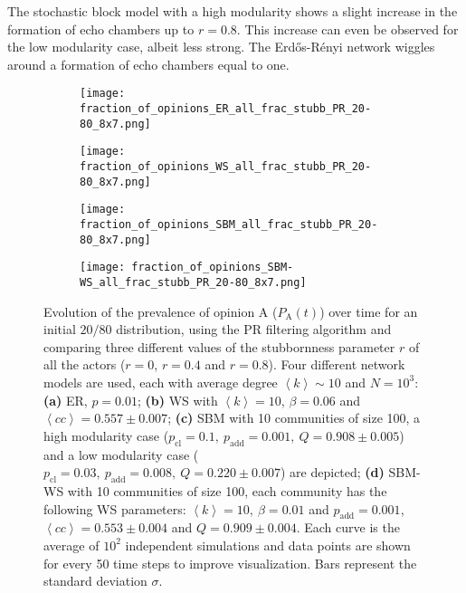 \documentclass[11 pt , letterpaper , twoside , openright]{book}
\begin{document}
\newline
The stochastic block model with a high modularity shows a slight increase in the formation of echo chambers up to $r = 0.8$. This increase can even be observed for the low modularity case, albeit less strong. The Erd\H{o}s-R\'{e}nyi network wiggles around a formation of echo chambers equal to one.
\newpage
\begin{figure}[H]
  \begin{subfigure}[b]{0.49\textwidth}
    \caption{}
  	\texttt{[image: fraction\_of\_opinions\_ER\_all\_frac\_stubb\_PR\_20-80\_8x7.png]}
  \end{subfigure}
  \begin{subfigure}[b]{0.49\textwidth}
    \caption{}
  	\texttt{[image: fraction\_of\_opinions\_WS\_all\_frac\_stubb\_PR\_20-80\_8x7.png]}
  \end{subfigure}
  \begin{subfigure}[b]{0.49\textwidth}
    \caption{}
    \texttt{[image: fraction\_of\_opinions\_SBM\_all\_frac\_stubb\_PR\_20-80\_8x7.png]}
  \end{subfigure}
  \begin{subfigure}[b]{0.49\textwidth}
    \caption{}
    \texttt{[image: fraction\_of\_opinions\_SBM-WS\_all\_frac\_stubb\_PR\_20-80\_8x7.png]}
  \end{subfigure}
  \captionsetup{format=plain}
  \caption[Evolution of the prevalence of opinion A ($P_\text{A}(t)$) over time for an initial $20/80$ opinion distribution, using the PR filtering algorithm and comparing three different values of the stubbornness parameter $r$ of all the actors ($r = 0$, $r = 0.4$ and $r = 0.8$).]{Evolution of the prevalence of opinion A ($P_\text{A}(t)$) over time for an initial $20/80$ distribution, using the PR filtering algorithm and comparing three different values of the stubbornness parameter $r$ of all the actors ($r = 0$, $r = 0.4$ and $r = 0.8$). Four different network models are used, each with average degree $\left<k\right> \sim 10$ and $N = 10^3$: \textbf{(a)} ER, $p=0.01$; \textbf{(b)} WS with $\left<k\right> = 10$, $\beta = 0.06$ and $\left<cc\right> = 0.557 \pm 0.007$; \textbf{(c)} SBM with 10 communities of size 100, a high modularity case ($p_{\text{cl}} = 0.1,\ p_{\text{add}} = 0.001,\ Q = 0.908 \pm 0.005$) and a low modularity case ($p_{\text{cl}} = 0.03,\ p_{\text{add}} = 0.008,\ Q = 0.220 \pm 0.007$) are depicted; \textbf{(d)} SBM-WS with 10 communities of size 100, each community has the following WS parameters: $\left<k\right> = 10,\ \beta = 0.01$ and $p_{\text{add}} = 0.001$, $\left<cc\right> = 0.553 \pm 0.004$ and $Q = 0.909 \pm 0.004$. Each curve is the average of $10^2$ independent simulations and data points are shown for every 50 time steps to improve visualization. Bars represent the standard deviation $\sigma$.}%
\label{ev_op_20_80_all_frac_stubb_PR}
\end{figure}
\end{document}
